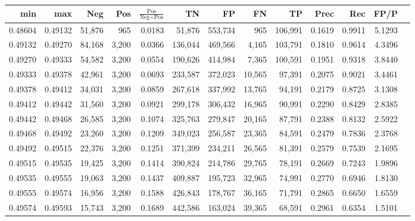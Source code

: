 \begin{tabular}{rrrrrrrrrrrrr}
\toprule
    min &     max &    Neg &   Pos & $\frac{\text{Pos}}{\text{Neg}+\text{Pos}}$ &      TN &      FP &      FN &      TP &   Prec &    Rec &   FP/P \\
\midrule
0.48604 & 0.49132 & 51,876 &   965 &                                     0.0183 &  51,876 & 553,734 &     965 & 106,991 & 0.1619 & 0.9911 & 5.1293 \\
0.49132 & 0.49270 & 84,168 & 3,200 &                                     0.0366 & 136,044 & 469,566 &   4,165 & 103,791 & 0.1810 & 0.9614 & 4.3496 \\
0.49270 & 0.49333 & 54,582 & 3,200 &                                     0.0554 & 190,626 & 414,984 &   7,365 & 100,591 & 0.1951 & 0.9318 & 3.8440 \\
0.49333 & 0.49378 & 42,961 & 3,200 &                                     0.0693 & 233,587 & 372,023 &  10,565 &  97,391 & 0.2075 & 0.9021 & 3.4461 \\
0.49378 & 0.49412 & 34,031 & 3,200 &                                     0.0859 & 267,618 & 337,992 &  13,765 &  94,191 & 0.2179 & 0.8725 & 3.1308 \\
0.49412 & 0.49442 & 31,560 & 3,200 &                                     0.0921 & 299,178 & 306,432 &  16,965 &  90,991 & 0.2290 & 0.8429 & 2.8385 \\
0.49442 & 0.49468 & 26,585 & 3,200 &                                     0.1074 & 325,763 & 279,847 &  20,165 &  87,791 & 0.2388 & 0.8132 & 2.5922 \\
0.49468 & 0.49492 & 23,260 & 3,200 &                                     0.1209 & 349,023 & 256,587 &  23,365 &  84,591 & 0.2479 & 0.7836 & 2.3768 \\
0.49492 & 0.49515 & 22,376 & 3,200 &                                     0.1251 & 371,399 & 234,211 &  26,565 &  81,391 & 0.2579 & 0.7539 & 2.1695 \\
0.49515 & 0.49535 & 19,425 & 3,200 &                                     0.1414 & 390,824 & 214,786 &  29,765 &  78,191 & 0.2669 & 0.7243 & 1.9896 \\
0.49535 & 0.49555 & 19,063 & 3,200 &                                     0.1437 & 409,887 & 195,723 &  32,965 &  74,991 & 0.2770 & 0.6946 & 1.8130 \\
0.49555 & 0.49574 & 16,956 & 3,200 &                                     0.1588 & 426,843 & 178,767 &  36,165 &  71,791 & 0.2865 & 0.6650 & 1.6559 \\
0.49574 & 0.49593 & 15,743 & 3,200 &                                     0.1689 & 442,586 & 163,024 &  39,365 &  68,591 & 0.2961 & 0.6354 & 1.5101 \\

\end{tabular}
